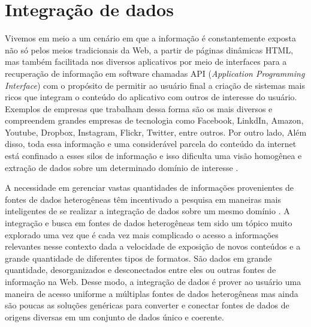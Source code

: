 \chapter{Integração de dados}
\label{cap:integracao}


Vivemos em meio a um cenário em que a informação é constantemente exposta não só pelos meios tradicionais da Web, a partir de páginas dinâmicas HTML, mas também facilitada nos diversos aplicativos por meio de interfaces para a recuperação de informação em software chamadas API (\emph{Application Programming Interface}) com o propósito de permitir ao usuário final a criação de sistemas mais ricos que integram o conteúdo do aplicativo com outros de interesse do usuário. Exemplos de empresas que trabalham dessa forma são os mais diversos e compreendem grandes empresas de tecnologia como Facebook, LinkdIn, Amazon, Youtube, Dropbox, Instagram, Flickr, Twitter, entre outros. Por outro lado, Além disso, toda essa informação e uma considerável parcela do conteúdo da internet está confinado a esses silos de informação e isso dificulta uma visão homogênea e extração de dados sobre um determinado domínio de interesse \citep{Heath2008, Civili2013}. 

A necessidade em gerenciar vastas quantidades de informações provenientes de fontes de dados heterogêneas têm incentivado a pesquisa em maneiras mais inteligentes de se realizar a integração de dados sobre um mesmo domínio \citep{Wang, Vettor2014}.
A integração e busca em fontes de dados heterogêneas tem sido um tópico muito explorado uma vez que é cada vez mais complicado o acesso a informações relevantes nesse contexto dada a velocidade de exposição de novos conteúdos e a grande quantidade de diferentes tipos de formatos. São dados em grande quantidade, desorganizados e desconectados entre eles ou outras fontes de informação na Web. Desse modo, a integração de dados é prover ao usuário uma maneira de acesso uniforme a múltiplas fontes de dados heterogêneas \citep{Wang} mas ainda são poucas as soluções genéricas para converter e conectar fontes de dados de origens diversas em um conjunto de dados único e coerente. 

